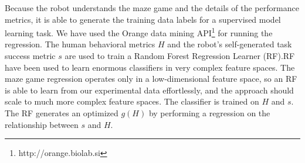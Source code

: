\documentclass{sig-alternate}
\begin{document}
Because the robot understands the maze game and the details of the
performance metrics, it is able to generate the training data labels
for a supervised model learning task.  We have used the Orange data
mining API\footnote{http://orange.biolab.si} for running the
regression.  The human behavioral metrics $H$ and the robot's
self-generated task success metric $s$ are used to train a Random Forest Regression Learner (RF).RF have been
used to learn enormous classifiers in very complex feature spaces. The maze game regression
operates only in a low-dimensional feature space, so an RF is able to
learn from our experimental data effortlessly, and the approach should
scale to much more complex feature spaces.  The classifier is trained
on $H$ and $s$.  The RF generates an optimized $g(H)$ by performing a
regression on the relationship between $s$ and $H$.

\end{document}
